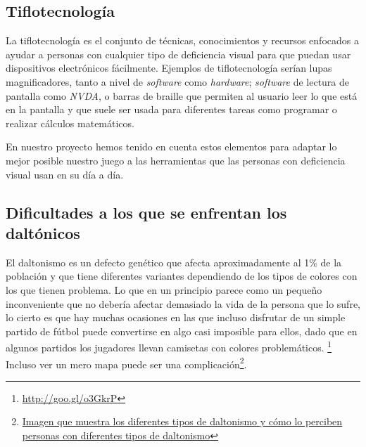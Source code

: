 \subsection{Tiflotecnología}

La tiflotecnología es el conjunto de técnicas, conocimientos y recursos enfocados a ayudar a personas con cualquier tipo de deficiencia visual para que puedan usar dispositivos electrónicos fácilmente.
Ejemplos de tiflotecnología serían lupas magnificadores, tanto a nivel de \textit{software} como \textit{hardware}; \textit{software} de lectura de pantalla como \textit{NVDA}, o barras de braille que permiten al usuario leer lo que está en la pantalla y que suele ser usada para diferentes tareas como programar o realizar cálculos matemáticos.

En nuestro proyecto hemos tenido en cuenta estos elementos para adaptar lo mejor posible nuestro juego a las herramientas que las personas con deficiencia visual usan en su día a día.

\subsection{Dificultades a los que se enfrentan los daltónicos}

El daltonismo es un defecto genético que afecta aproximadamente al 1\% de la población y que tiene diferentes variantes dependiendo de los tipos de colores con los que tienen problema. Lo que en un principio parece como un pequeño inconveniente que no debería afectar demasiado la vida de la persona que lo sufre, lo cierto es que hay muchas ocasiones en las que incluso disfrutar de un simple partido de fútbol puede convertirse en algo casi imposible para ellos, dado que en algunos partidos los jugadores llevan camisetas con colores problemáticos. \footnote{\url{http://goo.gl/o3GkrP}} Incluso ver un mero mapa puede ser una complicación\footnote{\href{https://i.imgur.com/CMCywUU.jpg}{Imagen que muestra los diferentes tipos de daltonismo y cómo lo perciben personas con diferentes tipos de daltonismo}}.

